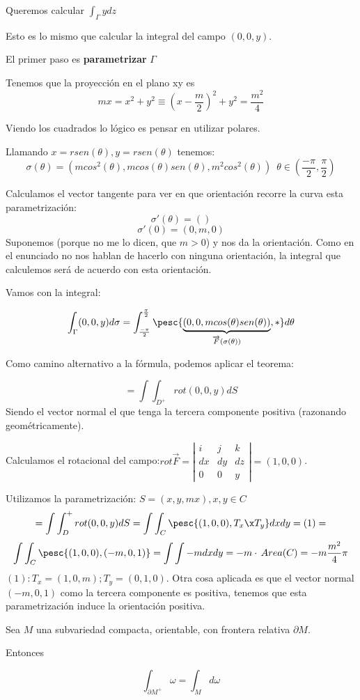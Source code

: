Queremos calcular $\displaystyle \int_{\Gamma}y dz$

Esto es lo mismo que calcular la integral del campo $(0,0,y)$.

El primer paso es \textbf{parametrizar} $\Gamma$

Tenemos que la proyección en el plano xy es \[mx=x^2+y^2 \equiv \left(x-\frac{m}{2}\right)^2 + y^2 = \frac{m^2}{4}\]

Viendo los cuadrados lo lógico es pensar en utilizar polares.

Llamando $x=rsen(\theta),y=rsen(\theta)$ tenemos:
\[\sigma(\theta) = \left(mcos^2(\theta),mcos(\theta)sen(\theta),m^2cos^2(\theta)\right)\,\,\,\theta\in\left(\frac{-\pi}{2},\frac{\pi}{2}\right)\]

Calculamos el vector tangente para ver en que orientación recorre la curva esta parametrización:
\[\sigma'(\theta) = ()\]
\[\sigma'(0) = (0,m,0)\]
Suponemos (porque no me lo dicen, que $m>0$) y nos da la orientación. Como en el enunciado no nos hablan de hacerlo con ninguna orientación, la integral que calculemos será de acuerdo con esta orientación.

Vamos con la integral:

\[\int_{\Gamma}(0,0,y) d\sigma =\int_{\frac{-\pi}{2}}^{\frac{\pi}{2}}\pesc{\underbrace{\left(0,0,mcos(\theta)sen(\theta)\right)}_{\overrightarrow{F}(\sigma(\theta))},\ast} d\theta\]

Como camino alternativo a la fórmula, podemos aplicar el teorema:

\[ = \int\int_{D^+}  rot(0,0,y)dS\] Siendo el vector normal el que tenga la tercera componente positiva (razonando geométricamente).

Calculamos el rotacional del campo:$rot\overrightarrow{F} =\left|\begin{matrix}
i&j&k\\dx&dy&dz\\0&0&y
\end{matrix}\right| = (1,0,0)$.

Utilizamos la parametrización: $S = (x,y,mx), x,y\in C$
\[ = \int\int_D^+ rot(0,0,y)dS = \int \int_C \pesc{(1,0,0) ,T_x\x T_y} dxdy= (1) =\]
\[ \int \int_C \pesc{(1,0,0),(-m,0,1)} = \int\int -m dxdy = -m \cdot \, Area (C) = -m\frac{m^2}{4}\pi \]
$(1): T_x = (1,0,m); T_y = (0,1,0) $. Otra cosa aplicada es que el vector normal $(-m,0,1)$ como la tercera componente es positiva, tenemos que esta parametrización induce la orientación positiva.


\begin{theorem}
Sea $M$ una subvariedad compacta, orientable, con frontera relativa $\partial  M$.

Entonces

\[\int_{\partial  M^+}\omega = \int_M d\omega \]

\end{theorem}

